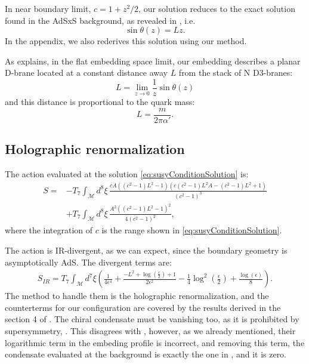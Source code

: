 In near boundary limit, $c = 1 + z^2/2$, our solution reduces to the exact solution found in the AdSxS background, as revealed in \cite{Karch:2005ms}, i.e.
\begin{equation}
 \sin\theta(z) = L z.
\end{equation}
In the appendix, we also rederives this solution using our method.

As \cite{Karch:2005ms} explains, in the flat embedding space limit, our embedding describes a planar D-brane located at a constant distance away $L$ from the stack of N D3-branes:
\begin{equation}
 L = \lim_{z \rightarrow 0 } \frac{1}{z} \sin\theta(z)
\end{equation}
and this distance is proportional to the quark mass:
\begin{equation}
 L = \dfrac{m}{2 \pi \alpha'}.
\end{equation}


\subsection{Holographic renormalization}

The action evaluated at the solution \eqref{eq:susyConditionSolution} is:
\begin{align}\label{eq:ActionAtSolution}
 S = & -T_7 \int_\mathcal{M} d^8\xi \, 
 \frac{c A \left(\left(c^2-1\right) L^2-1\right) \left(c \left(c^2-1\right) L^2 A-\left(c^2-1\right) L^2+1\right)}{\left(c^2-1\right)^3}
 \nonumber \\
     & +T_7\int _\mathcal{M} d^8\xi \, 
 \frac{A^2 \left(\left(c^2-1\right) L^2-1\right)^2}{4 \left(c^2-1\right)^2},
\end{align}
where the integration of $c$ is the range shown in \eqref{eq:susyConditionSolution}.

The action is IR-divergent, as we can expect, since the boundary geometry is asymptotically AdS. The divergent terms are:
\begin{align}
 S_{IR} = T_7 \int_\mathcal{M} d^7\xi 
        \left( \frac{1}{4 \epsilon ^4} +\frac{-L^2+\log \left(\frac{\epsilon }{2}\right)+1}{2 \epsilon ^2}-\frac{1}{4} \log ^2\left(\frac{\epsilon }{2}\right)+\frac{\log (\epsilon )}{8} \right).
\end{align}
The method to handle them is the holographic renormalization, and the counterterms for our configuration are covered by the results derived in the section 4 of \cite{Karch:2005ms}. The chiral condensate must be vanishing too, as it is prohibited by supersymmetry, \cite{Babington:2003vm}. This disagrees with \cite{Albash:2011nw}, however, as we already mentioned, their logarithmic term in the embeding profile is incorrect, and removing this term, the condensate evaluated at the background is exactly the one in \cite{Karch:2005ms}, and it is zero.






